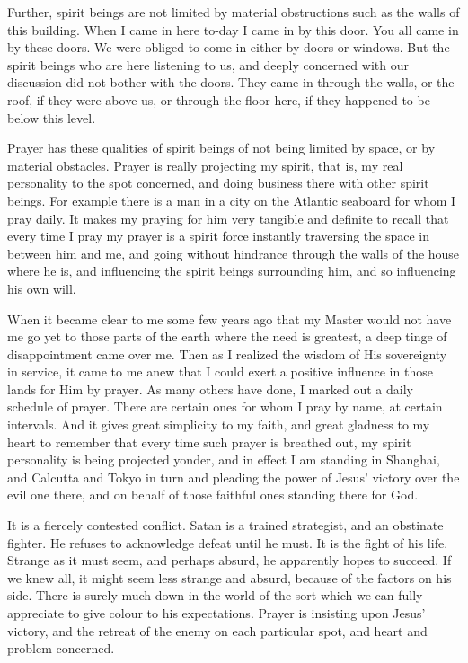 Further, spirit beings are not limited by material obstructions such as
the walls of this building. When I came in here to-day I came in by this
door. You all came in by these doors. We were obliged to come in either by
doors or windows. But the spirit beings who are here listening to us, and
deeply concerned with our discussion did not bother with the doors. They
came in through the walls, or the roof, if they were above us, or through
the floor here, if they happened to be below this level.

Prayer has these qualities of spirit beings of not being limited by space,
or by material obstacles. Prayer is really projecting my spirit, that is,
my real personality to the spot concerned, and doing business there with
other spirit beings. For example there is a man in a city on the Atlantic
seaboard for whom I pray daily. It makes my praying for him very tangible
and definite to recall that every time I pray my prayer is a spirit force
instantly traversing the space in between him and me, and going without
hindrance through the walls of the house where he is, and influencing the
spirit beings surrounding him, and so influencing his own will.

When it became clear to me some few years ago that my Master would not
have me go yet to those parts of the earth where the need is greatest, a
deep tinge of disappointment came over me. Then as I realized the wisdom
of His sovereignty in service, it came to me anew that I could exert a
positive influence in those lands for Him by prayer. As many others have
done, I marked out a daily schedule of prayer. There are certain ones for
whom I pray by name, at certain intervals. And it gives great simplicity
to my faith, and great gladness to my heart to remember that every time
such prayer is breathed out, my spirit personality is being projected
yonder, and in effect I am standing in Shanghai, and Calcutta and Tokyo in
turn and pleading the power of Jesus' victory over the evil one there, and
on behalf of those faithful ones standing there for God.

It is a fiercely contested conflict. Satan is a trained strategist, and an
obstinate fighter. He refuses to acknowledge defeat until he must. It is
the fight of his life. Strange as it must seem, and perhaps absurd, he
apparently hopes to succeed. If we knew all, it might seem less strange
and absurd, because of the factors on his side. There is surely much down
in the world of the sort which we can fully appreciate to give colour to
his expectations. Prayer is insisting upon Jesus' victory, and the retreat
of the enemy on each particular spot, and heart and problem concerned.

